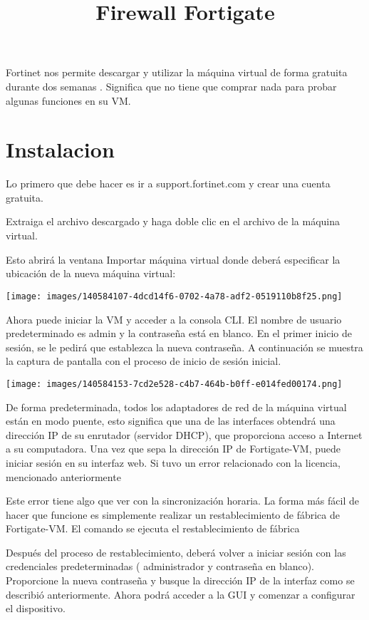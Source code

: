 \documentclass[10pt,a4paper]{article}
\title{Firewall Fortigate}
\begin{document}
\maketitle
	Fortinet nos permite descargar y utilizar la máquina virtual de forma gratuita durante dos semanas . Significa que no tiene que comprar nada para probar algunas funciones en su VM.
	
\section{Instalacion}

Lo primero que debe hacer es ir a support.fortinet.com y crear una cuenta gratuita.

Extraiga el archivo descargado y haga doble clic en el archivo de la máquina virtual.

Esto abrirá la ventana Importar máquina virtual donde deberá especificar la ubicación de la nueva máquina virtual:

\texttt{[image: images/140584107-4dcd14f6-0702-4a78-adf2-0519110b8f25.png]}

Ahora puede iniciar la VM y acceder a la consola CLI. El nombre de usuario predeterminado es admin y la contraseña está en blanco. En el primer inicio de sesión, se le pedirá que establezca la nueva contraseña. A continuación se muestra la captura de pantalla con el proceso de inicio de sesión inicial.


\texttt{[image: images/140584153-7cd2e528-c4b7-464b-b0ff-e014fed00174.png]}


De forma predeterminada, todos los adaptadores de red de la máquina virtual están en modo puente, esto significa que una de las interfaces obtendrá una dirección IP de su enrutador (servidor DHCP), que proporciona acceso a Internet a su computadora. Una vez que sepa la dirección IP de Fortigate-VM, puede iniciar sesión en su interfaz web. Si tuvo un error relacionado con la licencia, mencionado anteriormente


Este error tiene algo que ver con la sincronización horaria. La forma más fácil de hacer que funcione es simplemente realizar un restablecimiento de fábrica de Fortigate-VM. El comando se ejecuta el restablecimiento de fábrica 


Después del proceso de restablecimiento, deberá volver a iniciar sesión con las credenciales predeterminadas ( administrador y contraseña en blanco). Proporcione la nueva contraseña y busque la dirección IP de la interfaz como se describió anteriormente. Ahora podrá acceder a la GUI y comenzar a configurar el dispositivo.
\end{document}
